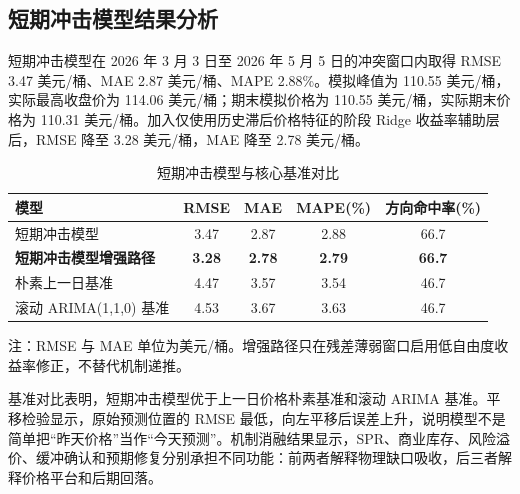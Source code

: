 \subsection{短期冲击模型结果分析}

短期冲击模型在 2026 年 3 月 3 日至 2026 年 5 月 5 日的冲突窗口内取得 RMSE 3.47 美元/桶、MAE 2.87 美元/桶、MAPE 2.88\%。模拟峰值为 110.55 美元/桶，实际最高收盘价为 114.06 美元/桶；期末模拟价格为 110.55 美元/桶，实际期末价格为 110.31 美元/桶。加入仅使用历史滞后价格特征的阶段 Ridge 收益率辅助层后，RMSE 降至 3.28 美元/桶，MAE 降至 2.78 美元/桶。

\begin{table}[!htbp]
\centering
\caption{短期冲击模型与核心基准对比}
\begin{threeparttable}
\begin{tabular}{l S[table-format=1.2] S[table-format=1.2] S[table-format=1.2] S[table-format=2.1]}
\toprule
模型 & {RMSE} & {MAE} & {MAPE(\%)} & {方向命中率(\%)} \\
\midrule
短期冲击模型 & 3.47 & 2.87 & 2.88 & 66.7 \\
\textbf{短期冲击模型增强路径} & \textbf{3.28} & \textbf{2.78} & \textbf{2.79} & \textbf{66.7} \\
朴素上一日基准 & 4.47 & 3.57 & 3.54 & 46.7 \\
滚动 ARIMA(1,1,0) 基准 & 4.53 & 3.67 & 3.63 & 46.7 \\
\bottomrule
\end{tabular}
\begin{tablenotes}
\footnotesize
\item 注：RMSE 与 MAE 单位为美元/桶。增强路径只在残差薄弱窗口启用低自由度收益率修正，不替代机制递推。
\end{tablenotes}
\end{threeparttable}
\end{table}

基准对比表明，短期冲击模型优于上一日价格朴素基准和滚动 ARIMA 基准。平移检验显示，原始预测位置的 RMSE 最低，向左平移后误差上升，说明模型不是简单把“昨天价格”当作“今天预测”。机制消融结果显示，SPR、商业库存、风险溢价、缓冲确认和预期修复分别承担不同功能：前两者解释物理缺口吸收，后三者解释价格平台和后期回落。
